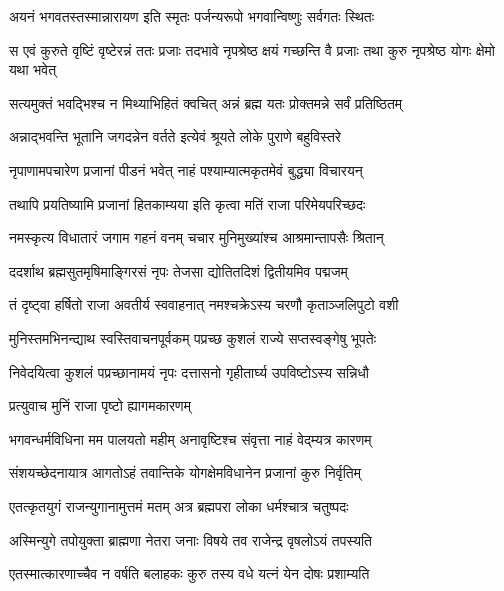 \twolineshloka
{अयनं भगवतस्तस्मान्नारायण इति स्मृतः}
{पर्जन्यरूपो भगवान्विष्णुः सर्वगतः स्थितः}%

\threelineshloka
{स एवं कुरुते वृष्टिं वृष्टेरन्नं ततः प्रजाः}
{तदभावे नृपश्रेष्ठ क्षयं गच्छन्ति वै प्रजाः}
{तथा कुरु नृपश्रेष्ठ योगः क्षेमो यथा भवेत्}%


\twolineshloka
{सत्यमुक्तं भवद्भिश्च न मिथ्याभिहितं क्वचित्}
{अन्नं ब्रह्म यतः प्रोक्तमन्ने सर्वं प्रतिष्ठितम्}%

\twolineshloka
{अन्नाद्भवन्ति भूतानि जगदन्नेन वर्तते}
{इत्येवं श्रूयते लोके पुराणे बहुविस्तरे}%

\twolineshloka
{नृपाणामपचारेण प्रजानां पीडनं भवेत्}
{नाहं पश्याम्यात्मकृतमेवं बुद्ध्या विचारयन्}%

\twolineshloka
{तथापि प्रयतिष्यामि प्रजानां हितकाम्यया}
{इति कृत्वा मतिं राजा परिमेयपरिच्छदः}%

\twolineshloka
{नमस्कृत्य विधातारं जगाम गहनं वनम्}
{चचार मुनिमुख्यांश्च आश्रमान्तापसैः श्रितान्}%

\twolineshloka
{ददर्शाथ ब्रह्मसुतमृषिमाङ्गिरसं नृपः}
{तेजसा द्योतितदिशं द्वितीयमिव पद्मजम्}%

\twolineshloka
{तं दृष्ट्वा हर्षितो राजा अवतीर्य स्ववाहनात्}
{नमश्चक्रेऽस्य चरणौ कृताञ्जलिपुटो वशी}%

\twolineshloka
{मुनिस्तमभिनन्द्याथ स्वस्तिवाचनपूर्वकम्}
{पप्रच्छ कुशलं राज्ये सप्तस्वङ्गेषु भूपतेः}%

\twolineshloka
{निवेदयित्वा कुशलं पप्रच्छानामयं नृपः}
{दत्तासनो गृहीतार्घ्य उपविष्टोऽस्य सन्निधौ}%

\onelineshloka
{प्रत्युवाच मुनिं राजा पृष्टो ह्यागमकारणम्}%


\twolineshloka
{भगवन्धर्मविधिना मम पालयतो महीम्}
{अनावृष्टिश्च संवृत्ता नाहं वेद्म्यत्र कारणम्}%

\twolineshloka
{संशयच्छेदनायात्र आगतोऽहं तवान्तिके}
{योगक्षेमविधानेन प्रजानां कुरु निर्वृतिम्}%


\twolineshloka
{एतत्कृतयुगं राजन्युगानामुत्तमं मतम्}
{अत्र ब्रह्मपरा लोका धर्मश्चात्र चतुष्पदः}%

\twolineshloka
{अस्मिन्युगे तपोयुक्ता ब्राह्मणा नेतरा जनाः}
{विषये तव राजेन्द्र वृषलोऽयं तपस्यति}%

\twolineshloka
{एतस्मात्कारणाच्चैव न वर्षति बलाहकः}
{कुरु तस्य वधे यत्नं येन दोषः प्रशाम्यति}%

